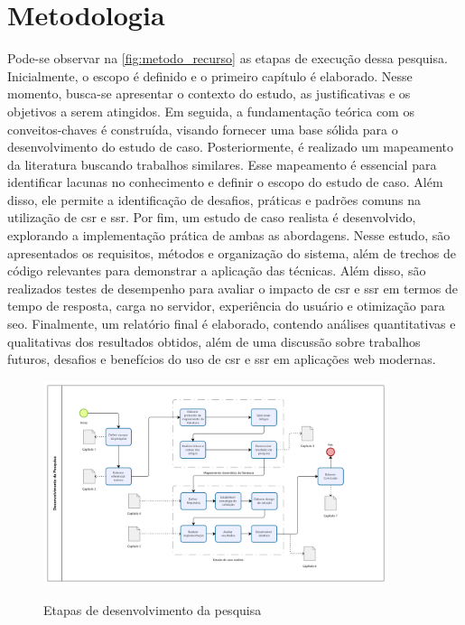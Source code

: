 \section{Metodologia}
Pode-se observar na \autoref{fig:metodo_recurso} as etapas de execução dessa pesquisa. Inicialmente, o escopo é definido e o primeiro capítulo é elaborado. Nesse momento, busca-se apresentar o contexto do estudo, as justificativas e os objetivos a serem atingidos. Em seguida, a fundamentação teórica com os conveitos-chaves é construída, visando fornecer uma base sólida para o desenvolvimento do estudo de caso.
Posteriormente, é realizado um mapeamento da literatura buscando trabalhos similares. Esse mapeamento é essencial para identificar lacunas no conhecimento e definir o escopo do estudo de caso. Além disso, ele permite a identificação de desafios, práticas e padrões comuns na utilização de \acrshort{csr} e \acrshort{ssr}.
Por fim, um estudo de caso realista é desenvolvido, explorando a implementação prática de ambas as abordagens. Nesse estudo, são apresentados os requisitos, métodos e organização do sistema, além de trechos de código relevantes para demonstrar a aplicação das técnicas. Além disso, são realizados testes de desempenho para avaliar o impacto de \acrshort{csr} e \acrshort{ssr} em termos de tempo de resposta, carga no servidor, experiência do usuário e otimização para \acrshort{seo}.
Finalmente, um relatório final é elaborado, contendo análises quantitativas e qualitativas dos resultados obtidos, além de uma discussão sobre trabalhos futuros, desafios e benefícios do uso de \acrshort{csr} e \acrshort{ssr} em aplicações web modernas.

\begin{figure}[h!]
    \centering
    \caption{Etapas de desenvolvimento da pesquisa}
    \includegraphics[width=0.9\textwidth]{media/bpmn_metodo_recurso.png}
    \label{fig:metodo_recurso}
\end{figure}

